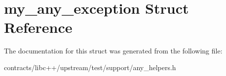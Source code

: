 \hypertarget{structmy__any__exception}{}\section{my\+\_\+any\+\_\+exception Struct Reference}
\label{structmy__any__exception}


The documentation for this struct was generated from the following file\+:\begin{DoxyCompactItemize}
\item 
contracts/libc++/upstream/test/support/any\+\_\+helpers.\+h\end{DoxyCompactItemize}
